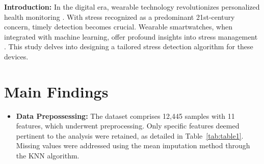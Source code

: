 \documentclass{article}
\begin{document}
\textbf{Introduction:}
In the digital era, wearable technology revolutionizes personalized health monitoring \cite{ghaderi2015}. With stress recognized as a predominant 21st-century concern, timely detection becomes crucial. Wearable smartwatches, when integrated with machine learning, offer profound insights into stress management \cite{nkurikiyeyezu2019}. This study delves into designing a tailored stress detection algorithm for these devices.


\section{Main Findings}

\begin{itemize}
\item \textbf{Data Prepossessing:}
The dataset \cite{ravi2021} comprises 12,445 samples with 11 features, which underwent preprocessing. Only specific features deemed pertinent to the analysis were retained, as detailed in Table~\ref{tab:table1}. Missing values were addressed using the mean imputation method through the KNN algorithm.
\vspace{0.01cm}

\vspace{-0.8cm} %
\begin{table}[htbp]
  \centering
  \caption{Dataset}
    \label{tab:table1}
\end{table}
\vspace{0.01cm}




\end{itemize}
\end{document}
